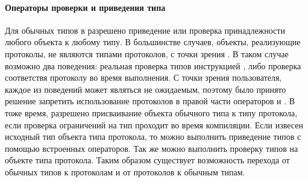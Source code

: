 \paragraph{Операторы проверки и приведения типа}
Для обычных типов в  разрешено приведение или проверка принадлежности любого объекта к любому типу. В большинстве случаев, объекты, реализующие протоколы, не являются типами протоколов, с точки зрения . В таком случае возможно два поведения: реальная проверка типов инструкцией , либо проверка соответствя протоколу во время выполнения. С точки зрения пользователя, каждое из поведений может являться не ожидаемым, поэтому было принято решение запретить использование протоколов в правой части операторов  и . В тоже время, разрешено присваивание объекта обычного типа к типу протокола, если проверка ограничений на тип проходит во время компиляции. Если извесен исходный тип объекта типа протокола, то можно выполнить приведение типов с помощью встроенных операторов. Так же можно выполнить проверку типов на объекте типа протокола. Таким образом существует возможность перехода от обычных типов к протоколам и от протоколов к обычным типам.

